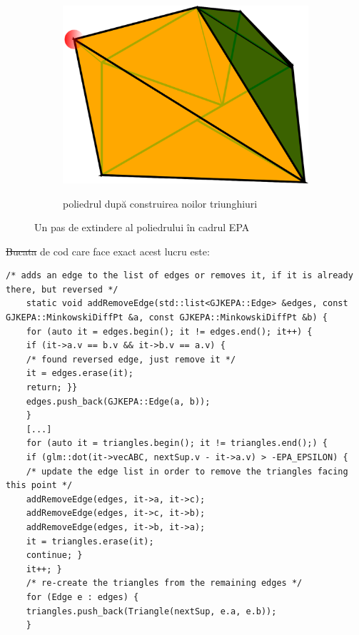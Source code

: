\documentclass[12pt,a4paper]{report}
\providecommand{\DIFaddtex}[1]{{\protect\color{blue}\uwave{#1}}} %
\providecommand{\DIFdeltex}[1]{{\protect\color{red}\sout{#1}}}                      %
\providecommand{\DIFaddbegin}{} %
\providecommand{\DIFaddend}{} %
\providecommand{\DIFdelbegin}{} %
\providecommand{\DIFdelend}{} %
\providecommand{\DIFadd}[1]{\texorpdfstring{\DIFaddtex{#1}}{#1}} %
\providecommand{\DIFdel}[1]{\texorpdfstring{\DIFdeltex{#1}}{}} %
\newcommand{\DIFscaledelfig}{0.5}
\newlength{\DIFdelgraphicswidth} %
\newlength{\DIFdelgraphicsheight} %
\newcommand{\DIFaddincludegraphics}[2][]{{\color{blue}\fbox{\DIFOincludegraphics[#1]{#2}}}} %
\newcommand{\DIFdelincludegraphics}[2][]{%
	\sbox{\DIFdelgraphicsbox}{\DIFOincludegraphics[#1]{#2}}%
	\settoboxwidth{\DIFdelgraphicswidth}{\DIFdelgraphicsbox} %
	\settoboxtotalheight{\DIFdelgraphicsheight}{\DIFdelgraphicsbox} %
	\scalebox{\DIFscaledelfig}{%
		\parbox[b]{\DIFdelgraphicswidth}{\usebox{\DIFdelgraphicsbox}\\[-\baselineskip] \rule{\DIFdelgraphicswidth}{0em}}\llap{\resizebox{\DIFdelgraphicswidth}{\DIFdelgraphicsheight}{%
				\setlength{\unitlength}{\DIFdelgraphicswidth}%
				\begin{picture}(1,1)%
				\thicklines\linethickness{2pt} %
				{\color[rgb]{1,0,0}\put(0,0){\framebox(1,1){}}}%
				{\color[rgb]{1,0,0}\put(0,0){\line( 1,1){1}}}%
				{\color[rgb]{1,0,0}\put(0,1){\line(1,-1){1}}}%
				\end{picture}%
			}\hspace*{3pt}}} %
} %
\DeclareRobustCommand{\DIFaddbegin}{\DIFOaddbegin \let\includegraphics\DIFaddincludegraphics} %
\DeclareRobustCommand{\DIFaddend}{\DIFOaddend \let\includegraphics\DIFOincludegraphics} %
\DeclareRobustCommand{\DIFdelbegin}{\DIFOdelbegin \let\includegraphics\DIFdelincludegraphics} %
\DeclareRobustCommand{\DIFdelend}{\DIFOaddend \let\includegraphics\DIFOincludegraphics} %
\begin{document}
\begin{figure}[H]
\begin{subfigure}[h]{0.32\textwidth}
			\includegraphics[width=\textwidth]{pics/EPA2.png}
			\label{fig:EPA2}
			\caption{poliedrul după construirea noilor triunghiuri}
			\vfill
		\end{subfigure}
		\caption{Un pas de extindere al poliedrului în cadrul EPA}
	\end{figure}
	
	\DIFdelbegin \DIFdel{Bucata }\DIFdelend \DIFaddbegin \DIFadd{Secvența }\DIFaddend de cod care face exact acest lucru este:
	\DIFdelbegin %
	\DIFdelend \DIFaddbegin \begin{lstlisting}[style=myC++, label={code:epa_expansion_step}, caption = {extinderea politopului în cadrul EPA}]
	/* adds an edge to the list of edges or removes it, if it is already there, but reversed */
	static void addRemoveEdge(std::list<GJKEPA::Edge> &edges, const GJKEPA::MinkowskiDiffPt &a, const GJKEPA::MinkowskiDiffPt &b) {
	for (auto it = edges.begin(); it != edges.end(); it++) {
	if (it->a.v == b.v && it->b.v == a.v) {
	/* found reversed edge, just remove it */
	it = edges.erase(it);
	return;	}}
	edges.push_back(GJKEPA::Edge(a, b));
	}
	[...]
	for (auto it = triangles.begin(); it != triangles.end();) {
	if (glm::dot(it->vecABC, nextSup.v - it->a.v) > -EPA_EPSILON) {
	/* update the edge list in order to remove the triangles facing this point */
	addRemoveEdge(edges, it->a, it->c);
	addRemoveEdge(edges, it->c, it->b);
	addRemoveEdge(edges, it->b, it->a);
	it = triangles.erase(it);
	continue; }
	it++; }
	/* re-create the triangles from the remaining edges */
	for (Edge e : edges) {
	triangles.push_back(Triangle(nextSup, e.a, e.b));
	}
	\end{lstlisting}
	
\end{document}

